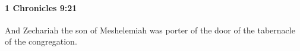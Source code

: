 
		\paragraph{1 Chronicles 9:21} %
			\label{1CHRONICLES-9-21}

			And Zechariah the son of Meshelemiah was porter of the door of the tabernacle of the congregation.



